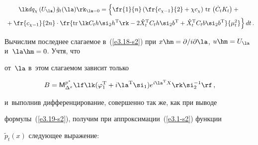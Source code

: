 \begin{multline}

\lk dq_\chi \left(U_\la\right)  \tilde g_t(\la) \rk_{\la=0} = \left\{

\vphantom{\fr{\mathrm{tr}\, \lk  C_t h\si_2

    h^{\mathrm{T}}\rk - 2\hat X_t^{\mathrm{T}} C_th\si_2 b^{\mathrm{T}} +

    \hat X_t^{\mathrm{T}} C_tb \si_2 b^{\mathrm{T}}}{\mu_t^2}}

     \fr{1}{n}

    \left( \fr{c_{\chi-1}}{2} +\chi c_\chi\right)\,\mathrm{tr}\, \left( \dot C_t

    K_t\right)+{}\right.\\

\left.{}+\fr{c_{\chi-1}}{2n} \cdot

\fr{\mathrm{tr}\, \lk  C_t h\si_2

    h^{\mathrm{T}}\rk - 2\hat X_t^{\mathrm{T}} C_th\si_2 b^{\mathrm{T}} +

    \hat X_t^{\mathrm{T}} C_tb \si_2 b^{\mathrm{T}}}{\mu_t^2} \right\} dt\,.

    \label{e3.32-s2}

    \end{multline}



Вычислим последнее слагаемое в~(\ref{e3.18-s2}) при $x

\hm=\partial/i\partial\la$, $u\hm= U_\la$ и~$\la\hm=0$. Учтя, что 

от~$\la$ в~этом слагаемом зависит только

$$

B ={\sf M}_{\Delta^x}^{p^*}\lf \lk(\varphi_1^{\mathrm{T}} +i\la^{\mathrm{T}}\si_1) 

e^{i\la^{\mathrm{T}} X}     \rk \si_2^{-1}\rf\,,

$$

и~выполнив дифференцирование, совершенно так же, как при выводе

формулы~(\ref{e3.19-s2}), получим при аппроксимации~(\ref{e3.1-s2}) функции

$\tilde p_t(x)$ следующее выражение:

